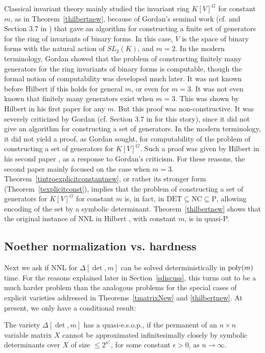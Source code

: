 \documentclass[11pt]{article}
\begin{document}
Classical invariant theory mainly studied the invariant ring $K[V]^G$  for constant  $m$,
as in Theorem~\ref{thilbertnew}, 
because of Gordan's seminal work (cf.  \cite{gordon}
and  Section 3.7 in \cite{sturmbook}) that gave an algorithm for 
constructing a finite set of generators for  the ring of invariants
of binary forms.
In this case, $V$ is the space of binary forms with the natural action of $SL_2(K)$, and  $m=2$. 
In the modern terminology, Gordan showed that the problem
of constructing finitely many generators for the ring invariants 
of binary forms is computable,
though the formal notion of computability  
was developed much later. 
It was not known before Hilbert if this  holds for general $m$,  or even for  $m=3$. 
It was not even known that finitely many generators exist  when $m=3$. 
This was shown by Hilbert  in his first paper \cite{hilbert0} for any $m$. 
But this proof was non-constructive.
It was severely criticized by Gordan (cf. Section 3.7 in \cite{sturmbook} for this story),  since 
it did not give an algorithm for constructing a set of generators. In
the modern terminology, it did not yield a proof,  as Gordan sought, for computability
of  the problem of constructing a set of generators for $K[V]^G$.
Such a proof was given by Hilbert in his second paper \cite{hilbert}, as a response to Gordan's criticism.
For these reasons,  the second paper  mainly focused on the
case when $m=3$. 
Theorem~\ref{tintroexplicitconstantnew}, or rather its stronger form (Theorem~\ref{texplicitconst}),   implies 
that the problem of constructing
a set of generators for $K[V]^G$ for constant $m$ is, in fact,
in  $\mbox{DET} \subseteq \mbox{NC} \subseteq \mbox{P}$, allowing 
encoding of the set by  a symbolic determinant.
Theorem~\ref{thilbertnew} shows that the original instance
of NNL  in Hilbert \cite{hilbert},  with constant $m$, is in quasi-P.

 \subsection{Noether normalization  vs.  hardness} \label{snnlvshard}
Next we ask if NNL for $\Delta[\det,m]$ can be solved deterministically
in  ${\mbox {poly}}(m)$ time. For the reasons explained later in Section~\ref{sdiscuss}, this turns out to be a much harder problem 
than the analogous problems for the special cases of explicit varieties addressed in Theorems~\ref{tmatrixNew} and 
\ref{thilbertnew}.
At present, we only have a conditional result:

\begin{theorem} \label{tintronnldetnew}
The variety   $\Delta[\det,m]$ has a quasi-e.s.o.p.,
if the  permanent of an $n \times n$ variable matrix $X$  cannot be 
approximated infinitesimally closely by 
symbolic determinants over  $X$ of   size $\le 2^{n^\epsilon}$, for some constant $\epsilon >0$, as $n\rightarrow \infty$.
\end{theorem}
\end{document}
